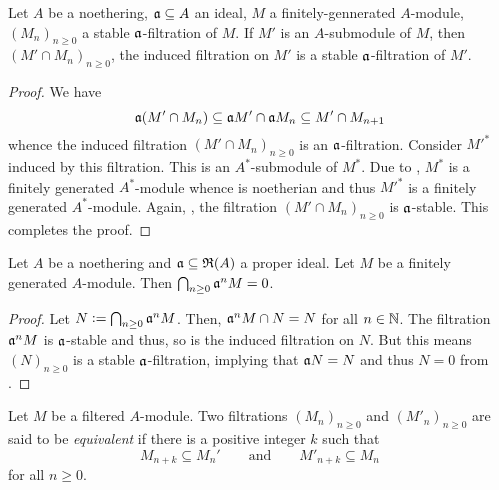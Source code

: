 \begin{lemma}
    Let $A$ be a noethering, $\mathfrak a\subseteq A$ an ideal, $M$ a finitely-gennerated $A$-module, $(M_n)_{n\ge 0}$ a stable $\mathfrak a$-filtration of $M$. If $M'$ is an $A$-submodule of $M$, then $(M'\cap M_n)_{n\ge 0}$, the induced filtration on $M'$ is a stable $\mathfrak a$-filtration of $M'$.
\end{lemma}
\begin{proof}
    We have 
    \begin{equation*}
        \mathfrak a(M'\cap M_n)\subseteq\mathfrak a M'\cap\mathfrak a M_n\subseteq M'\cap M_{n + 1}
    \end{equation*}
    whence the induced filtration $(M'\cap M_n)_{n\ge 0}$ is an $\mathfrak a$-filtration. Consider $M'^\ast$ induced by this filtration. This is an $A^\ast$-submodule of $M^\ast$. Due to , $M^\ast$ is a finitely generated $A^\ast$-module whence is noetherian and thus $M'^\ast$ is a finitely generated $A^\ast$-module. Again, , the filtration $(M'\cap M_n)_{n\ge 0}$ is $\mathfrak a$-stable. This completes the proof.
\end{proof}

\begin{corollary}
    Let $A$ be a noethering and $\mathfrak a\subseteq\mathfrak R(A)$ a proper ideal. Let $M$ be a finitely generated $A$-module. Then $\bigcap_{n\ge 0}\mathfrak a^nM=0$.
\end{corollary}
\begin{proof}
    Let $N := \bigcap_{n\ge 0}\mathfrak a^n M$. Then, $\mathfrak a^nM\cap N = N$ for all $n\in\mathbb{N}$. The filtration $\mathfrak a^nM$ is $\mathfrak a$-stable and thus, so is the induced filtration on $N$. But this means $(N)_{n\ge 0}$ is a stable $\mathfrak a$-filtration, implying that $\mathfrak a N = N$ and thus $N = 0$ from .
\end{proof}

\begin{definition}
    Let $M$ be a filtered $A$-module. Two filtrations $(M_n)_{n\ge 0}$ and $(M'_n)_{n\ge 0}$ are said to be \emph{equivalent} if there is a positive integer $k$ such that 
    \begin{equation*}
        M_{n + k}\subseteq M_n'\qquad\text{and}\qquad M'_{n + k}\subseteq M_n
    \end{equation*}
    for all $n\ge 0$.
\end{definition}


